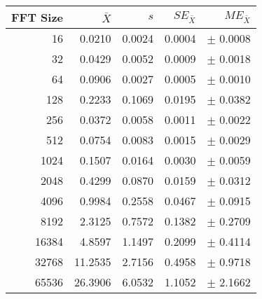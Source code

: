 \begin{tabular}{|r|r|r|r|r|}\hline
    FFT Size & $\bar{X}$ & $s$ & $SE_{\bar{X}}$ & $ME_{\bar{X}}$ \\ \hline
    16 & 0.0210 & 0.0024 & 0.0004 & $\pm$ 0.0008 \\ \hline
    32 & 0.0429 & 0.0052 & 0.0009 & $\pm$ 0.0018 \\ \hline
    64 & 0.0906 & 0.0027 & 0.0005 & $\pm$ 0.0010 \\ \hline
    128 & 0.2233 & 0.1069 & 0.0195 & $\pm$ 0.0382 \\ \hline
    256 & 0.0372 & 0.0058 & 0.0011 & $\pm$ 0.0022 \\ \hline
    512 & 0.0754 & 0.0083 & 0.0015 & $\pm$ 0.0029 \\ \hline
    1024 & 0.1507 & 0.0164 & 0.0030 & $\pm$ 0.0059 \\ \hline
    2048 & 0.4299 & 0.0870 & 0.0159 & $\pm$ 0.0312 \\ \hline
    4096 & 0.9984 & 0.2558 & 0.0467 & $\pm$ 0.0915 \\ \hline
    8192 & 2.3125 & 0.7572 & 0.1382 & $\pm$ 0.2709 \\ \hline
    16384 & 4.8597 & 1.1497 & 0.2099 & $\pm$ 0.4114 \\ \hline
    32768 & 11.2535 & 2.7156 & 0.4958 & $\pm$ 0.9718 \\ \hline
    65536 & 26.3906 & 6.0532 & 1.1052 & $\pm$ 2.1662 \\ \hline
\end{tabular}
